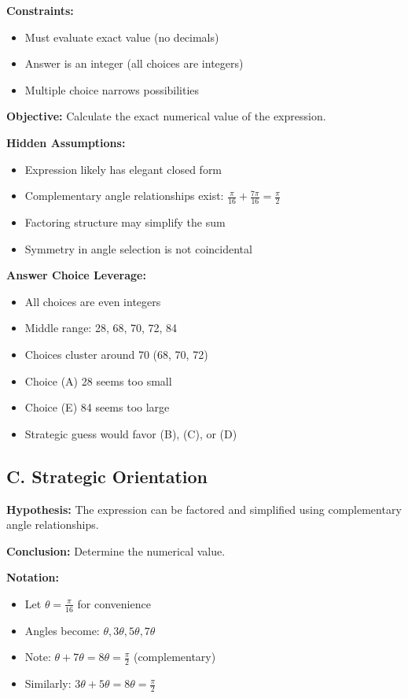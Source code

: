 \documentclass[12pt]{article}
\begin{document}
\begin{problemconfigbox}
\textbf{Constraints:}
\begin{itemize}
    \item Must evaluate exact value (no decimals)
    \item Answer is an integer (all choices are integers)
    \item Multiple choice narrows possibilities
\end{itemize}

\textbf{Objective:} Calculate the exact numerical value of the expression.

\textbf{Hidden Assumptions:}
\begin{itemize}
    \item Expression likely has elegant closed form
    \item Complementary angle relationships exist: $\frac{\pi}{16} + \frac{7\pi}{16} = \frac{\pi}{2}$
    \item Factoring structure may simplify the sum
    \item Symmetry in angle selection is not coincidental
\end{itemize}

\textbf{Answer Choice Leverage:}
\begin{itemize}
    \item All choices are even integers
    \item Middle range: 28, 68, 70, 72, 84
    \item Choices cluster around 70 (68, 70, 72)
    \item Choice (A) 28 seems too small
    \item Choice (E) 84 seems too large
    \item Strategic guess would favor (B), (C), or (D)
\end{itemize}

\subsection*{C. Strategic Orientation}

\textbf{Hypothesis:} The expression can be factored and simplified using complementary angle relationships.

\textbf{Conclusion:} Determine the numerical value.

\textbf{Notation:}
\begin{itemize}
    \item Let $\theta = \frac{\pi}{16}$ for convenience
    \item Angles become: $\theta, 3\theta, 5\theta, 7\theta$
    \item Note: $\theta + 7\theta = 8\theta = \frac{\pi}{2}$ (complementary)
    \item Similarly: $3\theta + 5\theta = 8\theta = \frac{\pi}{2}$
\end{itemize}


\end{problemconfigbox}
\end{document}
